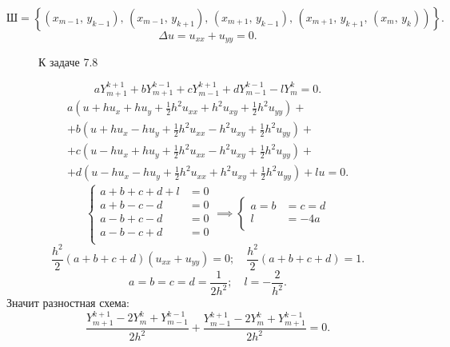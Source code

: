 \documentclass[a4paper]{article}
\begin{document}
\begin{sol}
\[
	\text{Ш}= \left\{ \left( x_{m-1},\,y_{k-1} \right),\,
		\left( x_{m-1},\,y_{k+1} \right) ,\,
		\left( x_{m+1},\,y_{k-1} \right) ,\,
		\left( x_{m+1},\,y_{k+1},\,
		\left( x_{m},\,y_k \right) \right) 
	\right\} 
.\] 
\[
\Delta u= u_{x x}+u_{y y}=0
.\] 
\begin{figure}[ht]
    \centering
    \caption{К задаче 7.8}
    \label{fig:1}
\end{figure}
\[
aY_{m+1}^{k+1}+b Y_{m+1}^{k-1}+c Y_{m-1}^{k+1}+d Y_{m-1}^{k-1}
-l Y_{m}^k=0
.\] 
\begin{multline*}
	a \left( u +h u_x +h u_y+ \frac{1}{2} h^2 u_{x x}
	+h^2 u_{xy}+\frac{1}{2} h^2 u_{y y}\right) +\\+
	b \left( u+ h u_x -h u_y + \frac{1}{2}h^2 u_{x x}
	-h^2 u_{xy}+ \frac{1}{2} h^2 u_{y y}\right) +\\+
	c\left( u-h u_x +h u_y + \frac{1}{2}h^2 u_{x x}
	-h^2 u_{x y} + \frac{1}{2} h^2 u_{y y}\right) +\\+
	d\left( u- h u_x - h u_y + \frac{1}{2}
	h^2 u_{x x} + h^2 u_{x y}+ \frac{1}{2}h^2 u_{y y}\right) 
	+lu=0
.\end{multline*} 
\[
\left\{
\begin{aligned}
a+b+c+d+l&= 0 \\
a+b-c-d&= 0 \\
a-b+c-d&= 0 \\
a-b-c+d&= 0 \\
\end{aligned}
\right.\implies
\left\{
\begin{aligned}
a=b&=c= d \\
l&= -4a \\
\end{aligned}
\right.
\] 
\[
	\frac{h^2}{2} \left( a+b+c+d \right) \left( 
	u_{x x}+u_{y y}\right) =0;\quad
	\frac{h^2}{2} \left( a+b+c+d \right) =1
.\] 
\[
a=b=c=d=\frac{1}{2h^2};\quad l=-\frac{2}{h^2}
.\] 
Значит разностная схема:
\[
\frac{Y_{m+1}^{k+1}-2 Y_{m}^k+Y_{m-1}^{k-1}}{2h^2}
+ \frac{Y_{m-1}^{k+1}-2Y_{m}^k+Y_{m+1}^{k-1}}{2h^2}=0
.\] 
\end{sol}
\end{document}
